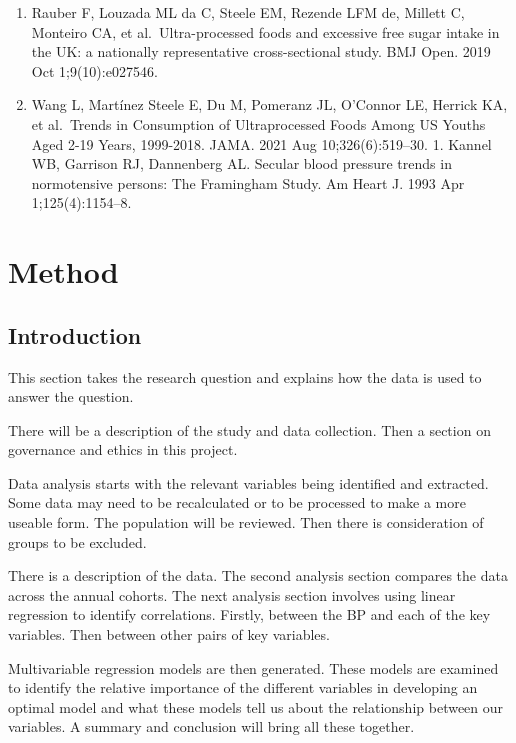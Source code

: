 \documentclass[
]{article}
\begin{document}
\begin{enumerate}
\item
  Rauber F, Louzada ML da C, Steele EM, Rezende LFM de, Millett C,
  Monteiro CA, et al.~Ultra-processed foods and excessive free sugar
  intake in the UK: a nationally representative cross-sectional study.
  BMJ Open. 2019 Oct 1;9(10):e027546.
\item
  Wang L, Martínez Steele E, Du M, Pomeranz JL, O'Connor LE, Herrick KA,
  et al.~Trends in Consumption of Ultraprocessed Foods Among US Youths
  Aged 2-19 Years, 1999-2018. JAMA. 2021 Aug 10;326(6):519--30. 1.
  Kannel WB, Garrison RJ, Dannenberg AL. Secular blood pressure trends
  in normotensive persons: The Framingham Study. Am Heart J. 1993 Apr
  1;125(4):1154--8.
\end{enumerate}

\newpage

\hypertarget{method}{%
\section{Method}\label{method}}

\hypertarget{introduction-2}{%
\subsection{Introduction}\label{introduction-2}}

This section takes the research question and explains how the data is
used to answer the question.

There will be a description of the study and data collection. Then a
section on governance and ethics in this project.

Data analysis starts with the relevant variables being identified and
extracted. Some data may need to be recalculated or to be processed to
make a more useable form. The population will be reviewed. Then there is
consideration of groups to be excluded.

There is a description of the data. The second analysis section compares
the data across the annual cohorts. The next analysis section involves
using linear regression to identify correlations. Firstly, between the
BP and each of the key variables. Then between other pairs of key
variables.

Multivariable regression models are then generated. These models are
examined to identify the relative importance of the different variables
in developing an optimal model and what these models tell us about the
relationship between our variables. A summary and conclusion will bring
all these together.
\end{document}

